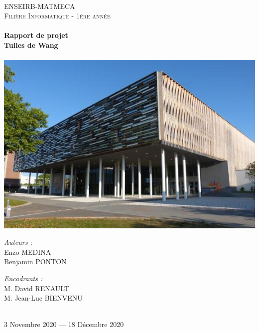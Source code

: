 \documentclass[a4paper]{article}
\begin{document}
\begin{titlepage}
    \begin{sffamily}
    \begin{center}
    
    ~\\[3cm]
    \textsc{\LARGE ENSEIRB-MATMECA}\\[1.5cm]
    
    \textsc{\Large Filière Informatique - 1ère année}\\[2cm]
    
    
        \hrulefill \\[0.4cm]
    { \Huge \bfseries Rapport de projet \\[0.4cm] }
    { \huge \bfseries Tuiles de Wang \\[0.4cm] }
     \hrulefill \\[2cm]
     
     \includegraphics[scale=0.6]{enseirb_matmeca.jpg} \\[1cm]
     
    \begin{minipage}{0.4\textwidth}
      \begin{flushleft} \large
         \emph{Auteurs :} \\
        Enzo MEDINA\\
        Benjamin PONTON\\
      \end{flushleft}
    \end{minipage}
    \begin{minipage}{0.4\textwidth}
      \begin{flushright} \large
        \emph{Encadrants :} \\
        M. David RENAULT\\
        M. Jean-Luc BIENVENU\\
      \end{flushright}
    \end{minipage}
    \\[1cm]
    
    {\large 3 Novembre 2020 — 18 Décembre 2020}
    
    \end{center}
    \end{sffamily}
\end{titlepage}
\end{document}
